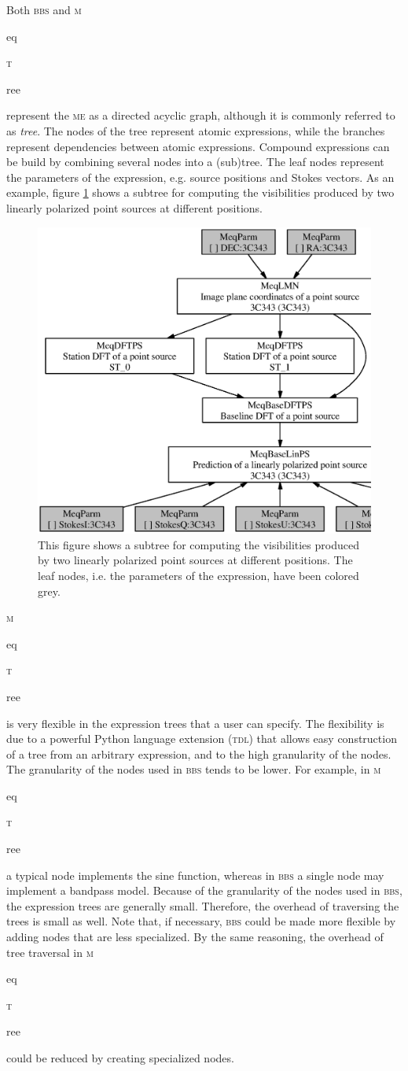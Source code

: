 \documentclass[10pt]{lofar}
\newcommand{\bbs}{\textsc{bbs}\xspace}
\newcommand{\me}{\textsc{me}\xspace}
\newcommand{\meqtree}{\textsc{m}\begin{footnotesize}eq\end{footnotesize}\textsc{t}\begin{footnotesize}ree\end{footnotesize}\xspace}
\begin{document}
Both \bbs and \meqtree represent the \me as a directed acyclic graph, although
it is commonly referred to as \emph{tree}. The nodes of the tree represent
atomic expressions, while the branches represent dependencies between atomic
expressions. Compound expressions can be build by combining several nodes into a
(sub)tree. The leaf nodes represent the parameters of the expression, e.g.
source positions and Stokes vectors. As an example, figure \ref{fig:expr_tree}
shows a subtree for computing the visibilities produced by two linearly
polarized point sources at different positions.
\begin{figure}[htbp]
\centering
\includegraphics[width=\textwidth]{images/expr_graph_sdd.ps}
\caption{This figure shows a subtree for computing the visibilities produced by
two linearly polarized point sources at different positions. The leaf nodes,
i.e. the parameters of the expression, have been colored grey.}
\label{fig:expr_tree}
\end{figure}

\meqtree is very flexible in the expression trees that a user can specify. The
flexibility is due to a powerful Python language extension (\textsc{tdl}) that
allows easy construction of a tree from an arbitrary expression, and to the high
granularity of the nodes. The granularity of the nodes used in \bbs tends to be
lower. For example, in \meqtree a typical node implements the sine function,
whereas in \bbs a single node may implement a bandpass model. Because of the
granularity of the nodes used in \bbs, the expression trees are generally small.
Therefore, the overhead of traversing the trees is small as well. Note that, if
necessary, \bbs could be made more flexible by adding nodes that are less
specialized. By the same reasoning, the overhead of tree traversal in \meqtree
could be reduced by creating specialized nodes.
\end{document}
